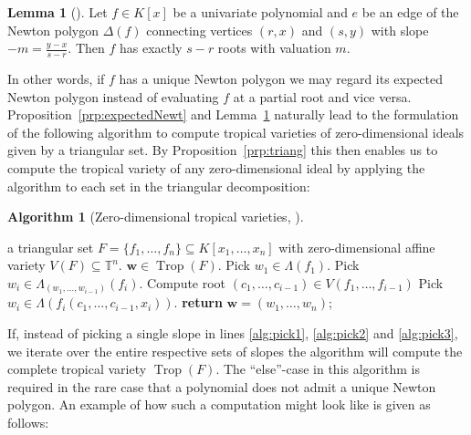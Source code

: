 \documentclass[
  paper=a4,
  titlepage,
  bibliography=totoc,
  pagesize=pdftex
]{scrartcl}
\numberwithin{figure}{section}
\numberwithin{equation}{section}
\numberwithin{table}{section}
\newcommand*\setT{\mathds{T}}
\let\vec\mathbf
\DeclareMathOperator{\Trop}{Trop}
\theoremstyle{definition}
\newtheorem{lemma}[definition]{Lemma}
\newtheorem{algo}[definition]{Algorithm}
\numberwithin{definition}{section}
\begin{document}
\begin{lemma}[{\cite[Proposition~II.6.3]{neuAlg}}]
  Let $f \in K[x]$ be a univariate polynomial and $e$ be an edge of the Newton polygon
  $\Delta(f)$ connecting vertices $(r,x)$ and $(s, y)$ with slope $-m = \frac{y-x}{s-r}$.
  Then $f$ has exactly $s-r$ roots with valuation $m$.
  \label{lem:newtPolyRoots}
\end{lemma}

In other words, if $f$ has a unique Newton polygon we may regard its expected Newton
polygon instead of evaluating $f$ at a partial root and vice versa.
Proposition~\ref{prp:expectedNewt} and Lemma~\ref{lem:newtPolyRoots} naturally lead to the
formulation of the following algorithm to compute tropical varieties of zero-dimensional
ideals given by a triangular set. By Proposition~\ref{prp:triang} this then enables us to
compute the tropical variety of any zero-dimensional ideal by applying the algorithm to
each set in the triangular decomposition:

\begin{algo}[Zero-dimensional tropical varieties,
  {\cite[Algorithm~2.10]{tropPointsLinks}}] $ $
  \begin{algorithmic}[1]
    \Require a triangular set $F = \{f_1, \dots, f_n\} \subseteq K[x_1, \dots, x_n]$ with
    zero-dimensional affine variety $V(F) \subseteq \setT^n$.
    \Ensure $\vec w \in \Trop(F)$.
    \State Pick $w_1 \in \Lambda(f_1)$.
    \label{alg:pick1}
        \State Pick $w_i \in \Lambda_{(w_1, \dots, w_{i-1})}(f_i)$.
        \label{alg:pick2}
      \Else
        \State Compute root $(c_1, \dots, c_{i-1}) \in V(f_1, \dots, f_{i-1})$
        \State Pick $w_i \in \Lambda(f_i(c_1, \dots, c_{i-1}, x_i))$.
        \label{alg:pick3}
      \EndIf
    \EndFor
    \State \textbf{return} $\vec w = (w_1, \dots, w_n)$;
  \end{algorithmic}
  \label{alg:zeroDimTrop}
\end{algo}

If, instead of picking a single slope in lines \ref{alg:pick1}, \ref{alg:pick2} and
\ref{alg:pick3}, we iterate over the entire respective sets of slopes the algorithm will
compute the complete tropical variety $\Trop(F)$. The \enquote{else}-case in this
algorithm is required in the rare case that a polynomial does not admit a unique Newton
polygon. An example of how such a computation might look like is given as follows:
\end{document}
